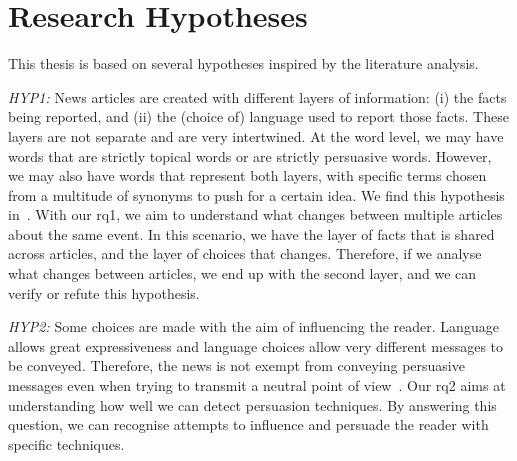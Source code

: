 \section{\statusgreen Research Hypotheses}
\label{sec:intro_hyp}

This thesis is based on several hypotheses inspired by the literature analysis.

\emph{HYP1:} News articles are created with different layers of information: (i) the facts being reported, and (ii) the (choice of) language used to report those facts.
These layers are not separate and are very intertwined. At the word level, we may have words that are strictly topical words or are strictly persuasive words. However, we may also have words that represent both layers, with specific terms chosen from a multitude of synonyms to push for a certain idea.
We find this hypothesis in~\citet{jenkins2013thin,vanderwicken1995news,jang2023proximate,bountouridis2018explaining}.
With our \acrshort{rq}1, we aim to understand what changes between multiple articles about the same event. In this scenario, we have the layer of facts that is shared across articles, and the layer of choices that changes. Therefore, if we analyse what changes between articles, we end up with the second layer, and we can verify or refute this hypothesis.

\emph{HYP2:} Some choices are made with the aim of influencing the reader. Language allows great expressiveness and language choices allow very different messages to be conveyed. Therefore, the news is not exempt from conveying persuasive messages even when trying to transmit a neutral point of view~\citep{gass2018persuasion}.
Our \acrshort{rq}2 aims at understanding how well we can detect persuasion techniques. By answering this question, we can recognise attempts to influence and persuade the reader with specific techniques.

